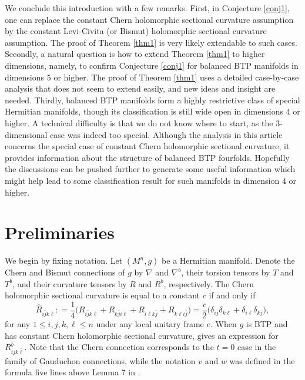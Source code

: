 \documentclass{amsart}
\begin{document}
We conclude this introduction with a few remarks. First, in Conjecture \ref{conj1}, one can replace the constant Chern holomorphic sectional curvature assumption by the constant Levi-Civita (or Bismut) holomorphic sectional curvature assumption. The proof of Theorem \ref{thm1} is very likely extendable to such cases. Secondly, a natural question is how to extend Theorem \ref{thm1} to higher dimensions, namely, to confirm Conjecture \ref{conj1} for balanced BTP manifolds in dimensions $5$ or higher. The proof of Theorem \ref{thm1} uses a detailed case-by-case analysis that does not seem to extend easily, and new ideas and insight are needed. Thirdly, balanced BTP manifolds form a highly restrictive class of special Hermitian manifolds, though its classification is still wide open in dimensions $4$ or higher. A technical difficulty is that we do not know where to start, as the $3$-dimensional case was indeed too special. Although the analysis in this article concerns the special case of constant Chern holomorphic sectional curvature, it provides information about the structure of balanced BTP fourfolds. Hopefully the discussions can be pushed further to generate some useful information which might help lead to some classification result for such manifolds in dimension $4$ or higher.



















\vspace{0.3cm}

\section{Preliminaries}

We begin by fixing notation. Let $(M^n,g)$ be a Hermitian manifold. Denote the Chern and Bismut connections of $g$ by $\nabla$ and $\nabla^b$, their torsion tensors by $T$ and $T^b$, and their curvature tensors by $R$ and $R^b$, respectively. The Chern holomorphic sectional curvature is equal to a constant $c$ if and only if
$$ \widehat{ R}_{i\bar{j}k\bar{\ell}}  : = \frac{1}{4}\big( R_{i\bar{j}k\bar{\ell}} + R_{k\bar{j}i\bar{\ell}} + R_{i\bar{\ell}k\bar{j}} + R_{k\bar{\ell}i\bar{j}} \big) =  \frac{c}{2} \big( \delta_{ij}\delta_{k\ell} + \delta_{i\ell}\delta_{kj} \big) ,$$
for any $1\leq i,j,k,\ell \leq n$ under any local unitary frame $e$. When $g$ is BTP and has constant Chern holomorphic sectional curvature, \cite[Lemma 8]{ChenZ26} gives an expression for $R^b_{i\bar{j}k\bar{\ell}}$. Note that the Chern connection corresponds to the $t=0$ case in the family of Gauduchon connections, while the notation $v$ and $w$ was defined in the formula five lines above Lemma 7 in \cite{ChenZ26}.
\end{document}
